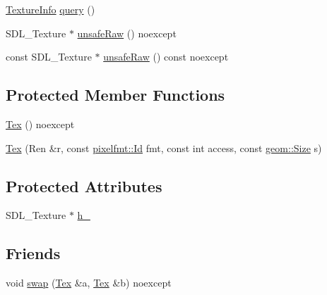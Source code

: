 \begin{DoxyCompactItemize}
\item 
\mbox{\hyperlink{structrolmodl_1_1texture_type_1_1_texture_info}{Texture\+Info}} \mbox{\hyperlink{classrolmodl_1_1texture_type_1_1_tex_a4b12de78def157d698d6476d7bbff97c}{query}} ()
\item 
S\+D\+L\+\_\+\+Texture $\ast$ \mbox{\hyperlink{classrolmodl_1_1texture_type_1_1_tex_a0b89c40ed763a6773cfdbf3d8bc33a10}{unsafe\+Raw}} () noexcept
\item 
const S\+D\+L\+\_\+\+Texture $\ast$ \mbox{\hyperlink{classrolmodl_1_1texture_type_1_1_tex_a5b4d3db4ca51b7a69ef1c3ac7d44e4bf}{unsafe\+Raw}} () const noexcept
\end{DoxyCompactItemize}
\subsection*{Protected Member Functions}
\begin{DoxyCompactItemize}
\item 
\mbox{\hyperlink{classrolmodl_1_1texture_type_1_1_tex_abef05fe3af325cacf54158107e011c8c}{Tex}} () noexcept
\item 
\mbox{\hyperlink{classrolmodl_1_1texture_type_1_1_tex_a91a624f3ad7c4c99058901f8f79db285}{Tex}} (Ren \&r, const \mbox{\hyperlink{namespacerolmodl_1_1pixelfmt_a96282713e4465ba9211c8fd3a702b52b}{pixelfmt\+::\+Id}} fmt, const int access, const \mbox{\hyperlink{structrolmodl_1_1geom_1_1_size}{geom\+::\+Size}} s)
\end{DoxyCompactItemize}
\subsection*{Protected Attributes}
\begin{DoxyCompactItemize}
\item 
S\+D\+L\+\_\+\+Texture $\ast$ \mbox{\hyperlink{classrolmodl_1_1texture_type_1_1_tex_afda4b73ec178af883ecbb0226c2842dd}{h\+\_\+}}
\end{DoxyCompactItemize}
\subsection*{Friends}
\begin{DoxyCompactItemize}
\item 
void \mbox{\hyperlink{classrolmodl_1_1texture_type_1_1_tex_a744fbfe68b849702086e95bc2a32286d}{swap}} (\mbox{\hyperlink{classrolmodl_1_1texture_type_1_1_tex}{Tex}} \&a, \mbox{\hyperlink{classrolmodl_1_1texture_type_1_1_tex}{Tex}} \&b) noexcept
\end{DoxyCompactItemize}


